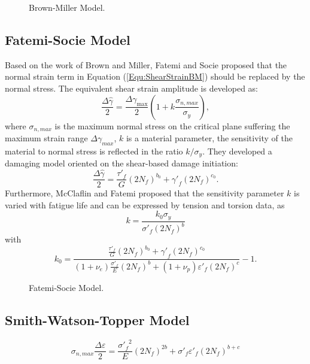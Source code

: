 \begin{figure}[!htp]
\caption{Brown-Miller Model.}
\label{Fig:NF-NP-TGMF-BM}
\end{figure}

\subsection{Fatemi-Socie Model}
Based on the work of Brown and Miller, Fatemi and Socie \cite{Fatemi1988} proposed that the normal strain term in Equation (\ref{Equ:ShearStrainBM}) should be replaced by the normal stress.
The equivalent shear strain amplitude is developed as:
\begin{equation}
\frac{{\Delta \hat \gamma }}{2} = \frac{{\Delta {\gamma _{\max }}}}{2}\left( {1 + k\frac{{{\sigma _{n,max}}}}{{{\sigma _y}}}} \right),
\end{equation}
where
$\sigma _{n,max}$ is the maximum normal stress on the critical plane suffering the maximum strain range $\Delta {\gamma _{max}}$, $k$ is a material parameter, the sensitivity of the material to normal stress is reflected in the ratio $k/\sigma_y$.
They developed a damaging model oriented on the shear-based damage initiation:
\begin{equation}
\frac{{\Delta \hat \gamma }}{2} = \frac{{{{\tau '}_f}}}{G}{\left( {2{N_f}} \right)^{{b_0}}} + {{\gamma '}_f}{\left( {2{N_f}} \right)^{{c_0}}}.
\end{equation}
Furthermore, McClaflin and Fatemi \cite{McClaflin2004} proposed that the sensitivity parameter $k$ is varied with fatigue life and can be expressed by tension and torsion data, as
\begin{equation}
k =  \frac{{k_0 {\sigma _y}}}{{{{\sigma '}_f}{{\left( {2{N_f}} \right)}^b}}}
\end{equation}
with
\[
k_0 =  {\frac{{\frac{{{{\tau '}_f}}}{G}{{\left( {2{N_f}} \right)}^{{b_0}}} + {{\gamma '}_f}{{\left( {2{N_f}} \right)}^{{c_0}}}}}{{\left( {1 + {\nu _e}} \right)\frac{{{{\sigma '}_f}}}{E}{{\left( {2{N_f}} \right)}^b} + \left( {1 + {\nu _p}} \right){{\varepsilon '}_f}{{\left( {2{N_f}} \right)}^c}}} - 1} .
\]

\begin{figure}[!htp]
\caption{Fatemi-Socie Model.}
\label{Fig:NF-NP-TGMF-FS}
\end{figure}

\subsection{Smith-Watson-Topper Model}
\[{\sigma _{n,max}}\frac{{\Delta \varepsilon }}{2} = \frac{{{{\sigma '}_f}^2}}{E}{\left( {2{N_f}} \right)^{2b}} + {\sigma '_f}{\varepsilon '_f}{\left( {2{N_f}} \right)^{b + c}}\]

